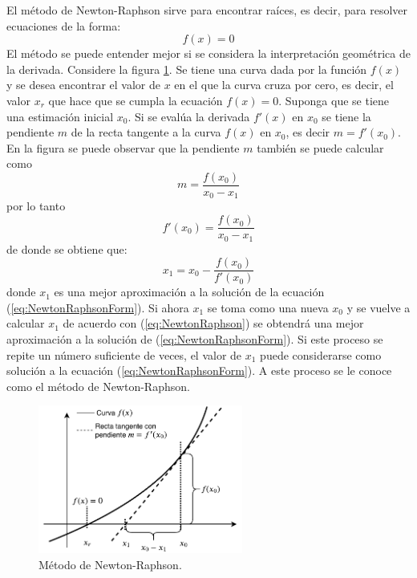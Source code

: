 \documentclass[a4paper,10pt]{article}
\begin{document}
El método de Newton-Raphson sirve para encontrar raíces, es decir, para resolver ecuaciones de la forma:
\begin{equation}
  f(x) = 0
  \label{eq:NewtonRaphsonForm}
\end{equation}
El método se puede entender mejor si se considera la interpretación geométrica de la derivada. Considere la figura \ref{fig:NewtonRaphson}. Se tiene una curva dada por la función $f(x)$ y se desea encontrar el valor de $x$ en el que la curva cruza por cero, es decir, el valor $x_r$ que hace que se cumpla la ecuación $f(x) = 0$. Suponga que se tiene una estimación inicial $x_0$. Si se evalúa la derivada $f'(x)$ en $x_0$ se tiene la pendiente $m$ de la recta tangente a la curva $f(x)$ en $x_0$, es decir $m=f'(x_0)$. En la figura se puede observar que la pendiente $m$ también se puede calcular como
\[m = \frac{f(x_0)}{x_0 - x_1}\]
por lo tanto
\[f'(x_0) = \frac{f(x_0)}{x_0 - x_1}\]
de donde se obtiene que:
\begin{equation}
  x_1 = x_0 - \frac{f(x_0)}{f'(x_0)}
  \label{eq:NewtonRaphson}
\end{equation}
donde $x_1$ es una mejor aproximación a la solución de la ecuación (\ref{eq:NewtonRaphsonForm}). Si ahora $x_1$ se toma como una nueva $x_0$ y se vuelve a calcular $x_1$ de acuerdo con (\ref{eq:NewtonRaphson}) se obtendrá una mejor aproximación a la solución de (\ref{eq:NewtonRaphsonForm}). Si este proceso se repite un número suficiente de veces, el valor de $x_1$ puede considerarse como solución a la ecuación (\ref{eq:NewtonRaphsonForm}). A este proceso se le conoce como el método de Newton-Raphson. 
\begin{figure}
  \centering
  \includegraphics[width=0.6\textwidth]{Figures/GeometricDerivate.pdf}
  \caption{Método de Newton-Raphson.}
  \label{fig:NewtonRaphson}
\end{figure}
\end{document}
